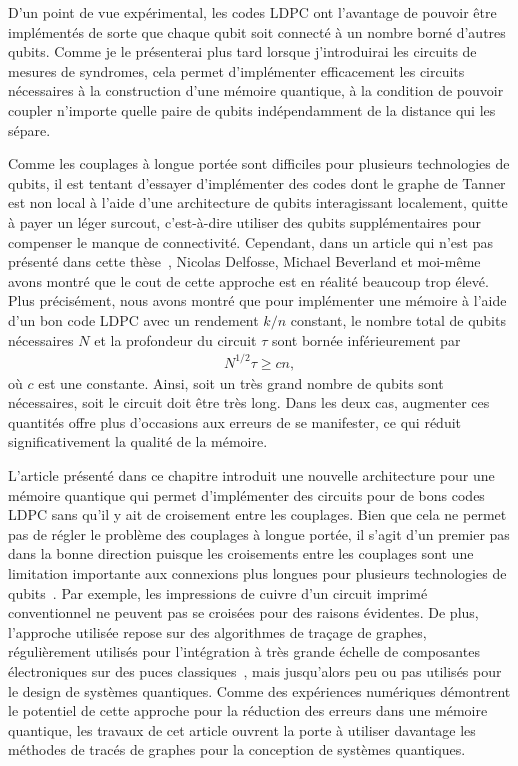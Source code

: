 D'un point de vue expérimental,
les codes LDPC ont l'avantage de pouvoir être implémentés de sorte que 
chaque qubit soit connecté à un nombre borné d'autres qubits.
Comme je le présenterai plus tard lorsque j'introduirai les circuits
de mesures de syndromes,
cela permet d'implémenter efficacement les circuits nécessaires à la
construction d'une mémoire quantique,
à la condition de pouvoir coupler n'importe quelle paire de qubits 
indépendamment de la distance qui les sépare.

Comme les couplages à longue portée sont difficiles pour plusieurs technologies de qubits,
il est tentant d'essayer d'implémenter des codes dont le graphe de Tanner est non local
à l'aide d'une architecture de qubits interagissant localement,
quitte à payer un léger surcout, c'est-à-dire utiliser des qubits supplémentaires
pour compenser le manque de connectivité.
Cependant,
dans un article qui n'est pas présenté dans cette thèse~\cite{delfosse_bounds_2021},
Nicolas Delfosse, Michael Beverland et moi-même avons montré que le cout de cette approche
est en réalité beaucoup trop élevé.
Plus précisément,
nous avons montré que pour implémenter une mémoire à l'aide d'un bon code LDPC
avec un rendement $k/n$ constant,
le nombre total de qubits nécessaires $N$ et la profondeur du circuit $\tau$ sont 
bornée inférieurement par 
\begin{align}
	N^{1/2} \tau \geq c n,
\end{align}
où $c$ est une constante.
Ainsi,
soit un très grand nombre de qubits sont nécessaires,
soit le circuit doit être très long.
Dans les deux cas,
augmenter ces quantités offre plus d'occasions aux erreurs de se manifester,
ce qui réduit significativement la qualité de la mémoire.

L'article présenté dans ce chapitre introduit une nouvelle architecture pour une mémoire quantique
qui permet d'implémenter des circuits pour de bons codes LDPC sans qu'il y ait de
croisement entre les couplages.
Bien que cela ne permet pas de régler le problème des couplages à longue portée,
il s'agit d'un premier pas dans la bonne direction puisque les croisements
entre les couplages sont une limitation importante aux connexions plus longues
pour plusieurs technologies de
qubits~\cite{sarovar_detecting_2020, debnath_demonstration_2016, neill_blueprint_2018, ash-saki_analysis_2020}.
Par exemple, 
les impressions de cuivre d'un circuit imprimé conventionnel ne peuvent pas se croisées
pour des raisons évidentes.
De plus,
l'approche utilisée repose sur des algorithmes de traçage de graphes,
régulièrement utilisés pour l'intégration à très grande échelle de composantes électroniques
sur des puces classiques~\cite{leighton_complexity_1983},
mais jusqu'alors peu ou pas utilisés pour le design de systèmes quantiques.
Comme des expériences numériques démontrent le potentiel de cette approche pour la réduction
des erreurs dans une mémoire quantique,
les travaux de cet article ouvrent la porte à utiliser davantage les méthodes 
de tracés de graphes pour la conception de systèmes quantiques.

